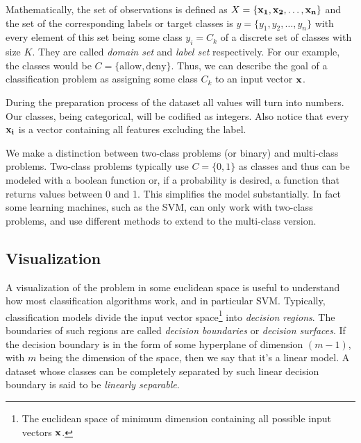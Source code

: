 Mathematically, the set of observations is defined as $X = \{\mathbf{x_1}, \mathbf{x_2}, \dots, \mathbf{x_n}\}$ and the set of the corresponding labels or target classes is $y = \{y_1, y_2, \dots, y_n\}$ with every element of this set being some class $y_i = C_k$ of a discrete set of classes with size $K$. They are called \emph{domain set} and \emph{label set} respectively. For our example, the classes would be $C = \{\text{allow}, \text{deny}\}$. Thus, we can describe the goal of a classification problem as assigning some class $C_k$ to an input vector $\mathbf{x}$.

During the preparation process of the dataset all values will turn into numbers. Our classes, being categorical, will be codified as integers. Also notice that every $\mathbf{x_i}$ is a vector containing all features excluding the label. 

We make a distinction between two-class problems (or binary) and multi-class problems. Two-class problems typically use $C = \{0, 1\}$ as classes and thus can be modeled with a boolean function or, if a probability is desired, a function that returns values between 0 and 1. This simplifies the model substantially. In fact some learning machines, such as the SVM, can only work with two-class problems, and use different methods to extend to the multi-class version.

\subsection{Visualization}
\label{sec:ch4.visualization}

A visualization of the problem in some euclidean space is useful to understand how most classification algorithms work, and in particular SVM. Typically, clas\-si\-fi\-cation models divide the input vector space\footnote{The euclidean space of minimum dimension containing all possible input vectors $\mathbf{x}$.} into \emph{decision regions}. The boundaries of such regions are called \emph{decision boundaries} or \emph{decision surfaces}. If the decision boundary is in the form of some hyperplane of dimension $(m - 1)$, with $m$ being the dimension of the space, then we say that it's a linear model. A dataset whose classes can be completely separated by such linear decision boundary is said to be \emph{linearly separable}.

